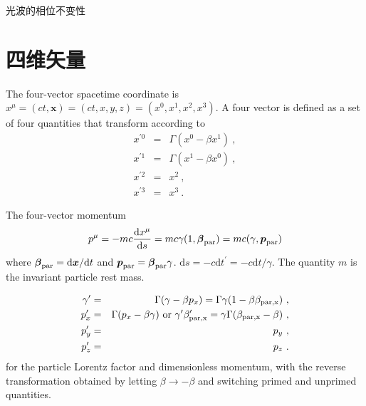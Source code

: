\documentclass[12pt,a4paper]{article}
\renewcommand{\vec}[1]{\boldsymbol{#1}}
\newcommand{\dif}{\mathrm{d}}
\begin{document}
光波的相位不变性


\section{四维矢量}
The four-vector spacetime coordinate is $x^\mu = (ct, \vec{x}) = (ct, x, y, z) = (x^0, x^1, x^2, x^3)$. A four vector is defined as a set of four quantities that transform according to
\begin{eqnarray*}
x^{\prime 0} &=& \Gamma (x^0 -\beta x^1) ~, \\
x^{\prime 1} &=& \Gamma (x^1 -\beta x^0) ~, \\
x^{\prime 2} &=& x^2 ~, \\
x^{\prime 3} &=& x^3 ~.
\end{eqnarray*}

The four-vector momentum
\begin{equation}
p^\mu = -mc \frac{\dif x^\mu}{\dif s} = mc\gamma(1, \vec{\beta}_{\rm par}) = mc(\gamma, \vec{p}_{\rm par})
\end{equation}
where $\vec{\beta}_{\rm par} = \dif \vec{x}/\dif t$ and $\vec{p}_{\rm par} = \vec{\beta}_{\rm par} \gamma$. $\dif s = -c\dif t^{\prime} = -c\dif t /\gamma$. The quantity $m$ is the invariant particle rest mass.

\begin{eqnarray*}
\gamma^{\prime} &=& \Gamma(\gamma -\beta p_x) = \Gamma \gamma(1-\beta \beta_{\rm par, x}) ~, \\
p^{\prime}_x &=& \Gamma(p_x -\beta \gamma)  ~ {\rm or} ~ \gamma^{\prime} \beta^{\prime}_{\rm par, x} = \gamma \Gamma (\beta_{\rm par, x} -\beta) ~, \\
p^{\prime}_y &=& p_y ~, \\
p^{\prime}_z &=& p_z ~.
\end{eqnarray*}
for the particle Lorentz factor and dimensionless momentum, with the reverse transformation obtained by letting $\beta \rightarrow -\beta$ and switching primed and unprimed quantities. 
\end{document}
